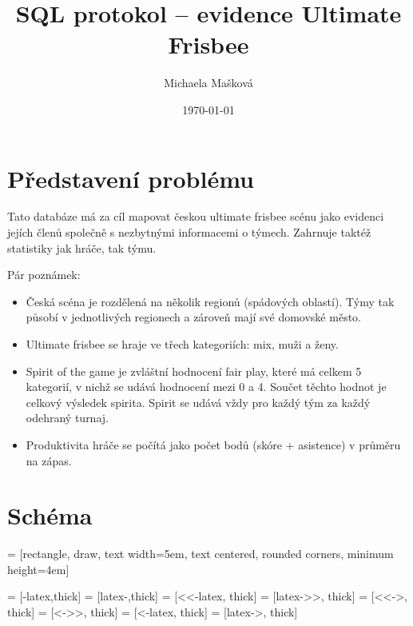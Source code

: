 \documentclass[11pt,oneside,american,czech]{book}
\title{SQL protokol -- evidence Ultimate Frisbee}
\author{Michaela Mašková}
\date{\today}
\begin{document}
\maketitle

\section*{Představení problému}

Tato databáze má za cíl mapovat českou ultimate frisbee scénu jako evidenci jejích členů společně s nezbytnými informacemi o týmech. Zahrnuje taktéž statistiky jak hráče, tak týmu.

Pár poznámek:

\begin{itemize}
	\item Česká scéna je rozdělená na několik regionů (spádových oblastí). Týmy tak působí v jednotlivých regionech a zároveň mají své domovské město.
	\item Ultimate frisbee se hraje ve třech kategoriích: mix, muži a ženy.
	\item Spirit of the game je zvláštní hodnocení fair play, které má celkem 5 kategorií, v nichž se udává hodnocení mezi 0 a 4. Součet těchto hodnot je celkový výsledek spirita. Spirit se udává vždy pro každý tým za každý odehraný turnaj.
	\item Produktivita hráče se počítá jako počet bodů (skóre + asistence) v průměru na zápas.
\end{itemize}

\section*{Schéma}

 = [rectangle, draw, text width=5em, text centered, rounded corners, minimum height=4em]

 = [-latex,thick]
 = [latex-,thick]
 = [<<-latex, thick]
 = [latex->>, thick]
 = [<<->, thick]
 = [<->>, thick]
 = [<-latex, thick]
 = [latex->, thick]
\end{document}
